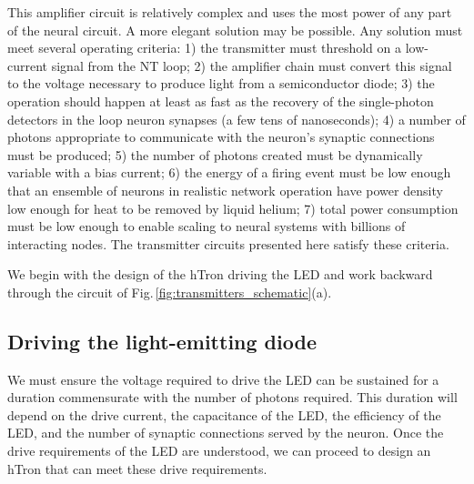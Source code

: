 \documentclass[twocolumn]{article}
\begin{document}
This amplifier circuit is relatively complex and uses the most power of any part of the neural circuit. A more elegant solution may be possible. Any solution must meet several operating criteria: 1) the transmitter must threshold on a low-current signal from the NT loop; 2) the amplifier chain must convert this signal to the voltage necessary to produce light from a semiconductor diode; 3) the operation should happen at least as fast as the recovery of the single-photon detectors in the loop neuron synapses (a few tens of nanoseconds); 4) a number of photons appropriate to communicate with the neuron's synaptic connections must be produced; 5) the number of photons created must be dynamically variable with a bias current; 6) the energy of a firing event must be low enough that an ensemble of neurons in realistic network operation have power density low enough for heat to be removed by liquid helium; 7) total power consumption must be low enough to enable scaling to neural systems with billions of interacting nodes. The transmitter circuits presented here satisfy these criteria.

We begin with the design of the hTron driving the LED and work backward through the circuit of Fig.\,\ref{fig:transmitters_schematic}(a).
	
\subsection{\label{sec:LED}Driving the light-emitting diode}
We must ensure the voltage required to drive the LED can be sustained for a duration commensurate with the number of photons required. This duration will depend on the drive current, the capacitance of the LED, the efficiency of the LED, and the number of synaptic connections served by the neuron. Once the drive requirements of the LED are understood, we can proceed to design an hTron that can meet these drive requirements.
\end{document}

